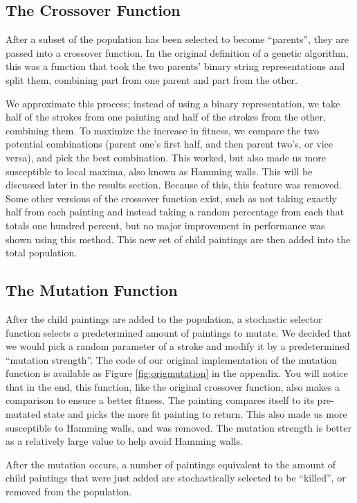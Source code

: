 \subsection{The Crossover Function}
After a subset of the population has been selected to become ``parents'', they are passed into a crossover function. In the original definition of a genetic algorithm, this was a function that took the two parents' binary string representations and split them, combining part from one parent and part from the other.\cite{fraser1957simulation}

We approximate this process; instead of using a binary representation, we take half of the strokes from one painting and half of the strokes from the other, combining them. To maximize the increase in fitness, we compare the two potential combinations (parent one's first half, and then parent two's, or vice versa), and pick the best combination. This worked, but also made us more susceptible to local maxima, also known as Hamming walls. This will be discussed later in the results section. Because of this, this feature was removed. Some other versions of the crossover function exist, such as not taking exactly half from each painting and instead taking a random percentage from each that totals one hundred percent, but no major improvement in performance was shown using this method.
This new set of child paintings are then added into the total population.

\subsection{The Mutation Function}
After the child paintings are added to the population, a stochastic selector function selects a predetermined amount of paintings to mutate. We decided that we would pick a random parameter of a stroke and modify it by a predetermined ``mutation strength''. The code of our original implementation of the mutation function is available as Figure \ref{fig:origmutation} in the appendix. You will notice that in the end, this function, like the original crossover function, also makes a comparison to ensure a better fitness. The painting compares itself to its pre-mutated state and picks the more fit painting to return. This also made us more susceptible to Hamming walls, and was removed. The mutation strength is better as a relatively large value to help avoid Hamming walls. 

After the mutation occurs, a number of paintings equivalent to the amount of child paintings that were just added are stochastically selected to be ``killed'', or removed from the population.

